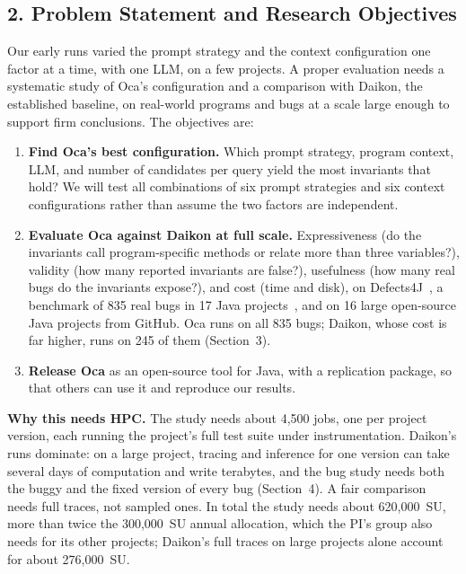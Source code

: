 \documentclass{article}
\begin{document}
\subsection*{2. Problem Statement and Research Objectives}
Our early runs varied the prompt strategy and the context configuration one factor at a time, with one LLM, on a few projects.
A proper evaluation needs a systematic study of Oca's configuration and a comparison with Daikon, the established baseline, on real-world programs and bugs at a scale large enough to support firm conclusions.
The objectives are:
\begin{enumerate}
\item \textbf{Find Oca's best configuration.} Which prompt strategy, program context, LLM, and number of candidates per query yield the most invariants that hold?
    We will test all combinations of six prompt strategies and six context configurations rather than assume the two factors are independent.
\item \textbf{Evaluate Oca against Daikon at full scale.} Expressiveness (do the invariants call program-specific methods or relate more than three variables?), validity (how many reported invariants are false?), usefulness (how many real bugs do the invariants expose?), and cost (time and disk), on Defects4J~\cite{JustJE2014}, a benchmark of 835 real bugs in 17 Java projects~\cite{Defects4J}, and on 16 large open-source Java projects from GitHub.
    Oca runs on all 835 bugs; Daikon, whose cost is far higher, runs on 245 of them (Section~3).
\item \textbf{Release Oca} as an open-source tool for Java, with a replication package, so that others can use it and reproduce our results.
\end{enumerate}
\textbf{Why this needs HPC.}
The study needs about 4,500 jobs, one per project version, each running the project's full test suite under instrumentation.
Daikon's runs dominate: on a large project, tracing and inference for one version can take several days of computation and write terabytes, and the bug study needs both the buggy and the fixed version of every bug (Section~4).
A fair comparison needs full traces, not sampled ones.
In total the study needs about 620,000~SU, more than twice the 300,000~SU annual allocation, which the PI's group also needs for its other projects; Daikon's full traces on large projects alone account for about 276,000~SU.
\end{document}
